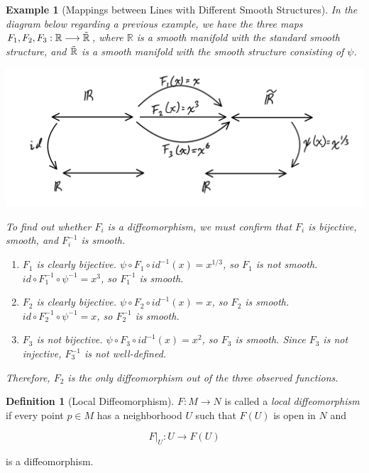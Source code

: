 \documentclass{article}
\newtheorem{example}{Example}[section]
\theoremstyle{remark}
\theoremstyle{definition}
\newtheorem{definition}{Definition}[section]
\begin{document}
    \begin{example}[Mappings between Lines with Different Smooth Structures]
      In the diagram below regarding a previous example, we have the three maps $F_1, F_2, F_3: \mathbb{R} \longrightarrow \Tilde{\mathbb{R}}$, where $\mathbb{R}$ is a smooth manifold with the standard smooth structure, and $\Tilde{\mathbb{R}}$ is a smooth manifold with the smooth structure consisting of $\psi$. 

      \begin{center}
        \includegraphics[scale=0.25]{img/Real_Line_Manifold_Functions.PNG}
      \end{center}

      To find out whether $F_i$ is a diffeomorphism, we must confirm that $F_i$ is bijective, smooth, and $F_i^{-1}$ is smooth. 

      \begin{enumerate}
        \item $F_1$ is clearly bijective. $\psi \circ F_1 \circ id^{-1} (x) = x^{1/3}$, so $F_1$ is not smooth. $id \circ F_1^{-1} \circ \psi^{-1} = x^3$, so $F_1^{-1}$ is smooth. 
        \item $F_2$ is clearly bijective. $\psi \circ F_2 \circ id^{-1} (x) = x$, so $F_2$ is smooth. $id \circ F_2^{-1} \circ \psi^{-1} = x$, so $F_2^{-1}$ is smooth.
        \item $F_3$ is not bijective. $\psi \circ F_3 \circ id^{-1} (x) = x^2$, so $F_3$ is smooth. Since $F_3$ is not injective, $F_3^{-1}$ is not well-defined. 
      \end{enumerate}

      Therefore, $F_2$ is the only diffeomorphism out of the three observed functions. 
    \end{example}

    \begin{definition}[Local Diffeomorphism]
      $F: M \longrightarrow N$ is called a \textit{local diffeomorphism} if every point $p \in M$ has a neighborhood $U$ such that $F(U)$ is open in $N$ and 

        \[F \big|_U : U \longrightarrow F(U)\]

      is a diffeomorphism. 
    \end{definition}
\end{document}

